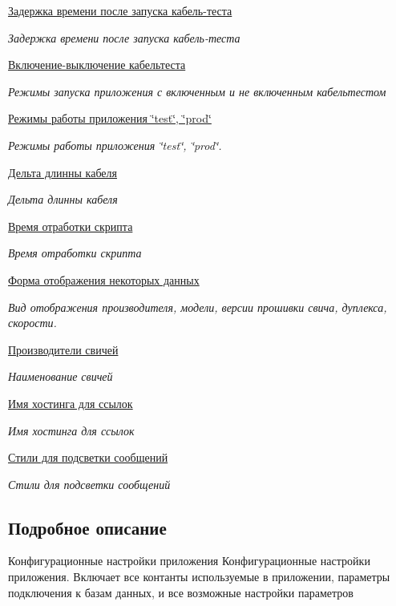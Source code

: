 \begin{DoxyCompactItemize}
\hyperlink{group__timeout__cabletest}{Задержка времени после запуска кабель-\/теста}
\begin{DoxyCompactList}\small\item\em Задержка времени после запуска кабель-\/теста \end{DoxyCompactList}\item 
\hyperlink{group__on__off__cabletest}{Включение-\/выключение кабельтеста}
\begin{DoxyCompactList}\small\item\em Режимы запуска приложения с включенным и не включенным кабельтестом \end{DoxyCompactList}\item 
\hyperlink{group__mode}{Режимы работы приложения \char`\"{}test\char`\"{}, \char`\"{}prod\char`\"{}}
\begin{DoxyCompactList}\small\item\em Режимы работы приложения \char`\"{}test\char`\"{}, \char`\"{}prod\char`\"{}. \end{DoxyCompactList}\item 
\hyperlink{group__cable__length}{Дельта длинны кабеля}
\begin{DoxyCompactList}\small\item\em Дельта длинны кабеля \end{DoxyCompactList}\item 
\hyperlink{group__code__time}{Время отработки скрипта}
\begin{DoxyCompactList}\small\item\em Время отработки скрипта \end{DoxyCompactList}\item 
\hyperlink{group__data__view}{Форма отображения некоторых данных}
\begin{DoxyCompactList}\small\item\em Вид отображения производителя, модели, версии прошивки свича, дуплекса, скорости. \end{DoxyCompactList}\item 
\hyperlink{group__switch__manufacturer}{Производители свичей}
\begin{DoxyCompactList}\small\item\em Наименование свичей \end{DoxyCompactList}\item 
\hyperlink{group__host__for__link}{Имя хостинга для ссылок}
\begin{DoxyCompactList}\small\item\em Имя хостинга для ссылок \end{DoxyCompactList}\item 
\hyperlink{group__styles}{Стили для подсветки сообщений}
\begin{DoxyCompactList}\small\item\em Стили для подсветки сообщений \end{DoxyCompactList}\end{DoxyCompactItemize}


\subsection{Подробное описание}
Конфигурационные настройки приложения Конфигурационные настройки приложения. Включает все контанты используемые в приложении, параметры подключения к базам данных, и все возможные настройки параметров 
